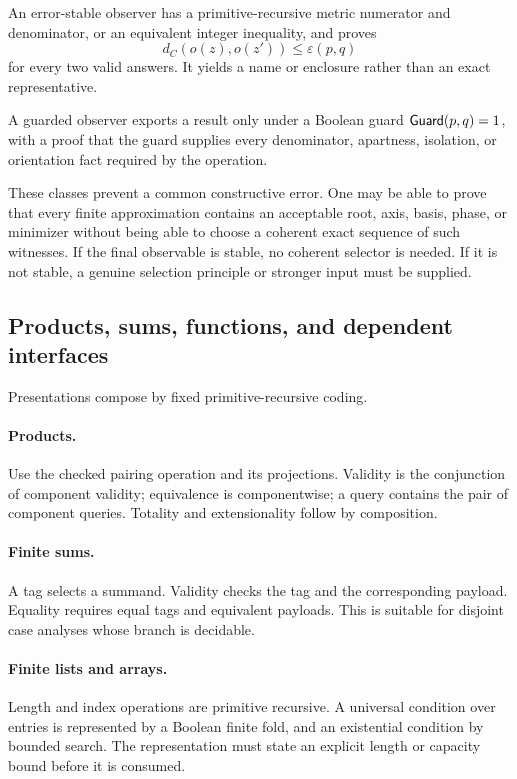 \begin{definition}
An error-stable observer has a primitive-recursive metric numerator and
denominator, or an equivalent integer inequality, and proves
\[
  d_C(o(z),o(z'))\le \varepsilon(p,q)
\]
for every two valid answers.  It yields a name or enclosure rather than an
exact representative.
\end{definition}

\begin{definition}
A guarded observer exports a result only under a Boolean guard
\(\mathsf{Guard}(p,q)=1\), with a proof that the guard supplies every denominator,
apartness, isolation, or orientation fact required by the operation.
\end{definition}

These classes prevent a common constructive error.  One may be able to prove
that every finite approximation contains an acceptable root, axis, basis,
phase, or minimizer without being able to choose a coherent exact sequence of
such witnesses.  If the final observable is stable, no coherent selector is
needed.  If it is not stable, a genuine selection principle or stronger input
must be supplied.

\subsection{Products, sums, functions, and dependent interfaces}

Presentations compose by fixed primitive-recursive coding.

\paragraph{Products.}
Use the checked pairing operation and its projections.  Validity is the
conjunction of component validity; equivalence is componentwise; a query
contains the pair of component queries.  Totality and extensionality follow by
composition.

\paragraph{Finite sums.}
A tag selects a summand.  Validity checks the tag and the corresponding
payload.  Equality requires equal tags and equivalent payloads.  This is
suitable for disjoint case analyses whose branch is decidable.

\paragraph{Finite lists and arrays.}
Length and index operations are primitive recursive.  A universal condition
over entries is represented by a Boolean finite fold, and an existential
condition by bounded search.  The representation must state an explicit
length or capacity bound before it is consumed.

